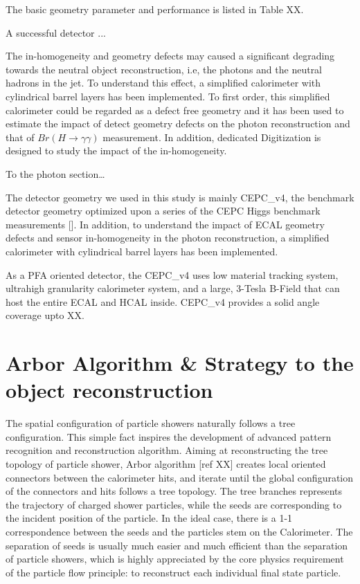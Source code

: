 The basic geometry parameter and performance is listed in Table XX. 


A successful detector ... 

The in-homogeneity and geometry defects may caused a significant degrading towards the neutral object reconstruction,
i.e, the photons and the neutral hadrons in the jet.
To understand this effect, a simplified calorimeter with cylindrical barrel layers has been implemented.
To first order, this simplified calorimeter could be regarded as a defect free geometry
and it has been used to estimate the impact of detect geometry defects on the photon reconstruction
and that of $Br(H\to\gamma\gamma)$ measurement.
In addition, dedicated Digitization is designed to study the impact of the in-homogeneity. 

To the photon section…

The detector geometry we used in this study is mainly CEPC\_v4,
the benchmark detector geometry optimized upon a series of the CEPC Higgs benchmark measurements [].
In addition, to understand the impact of ECAL geometry defects and sensor in-homogeneity in the photon reconstruction,
a simplified calorimeter with cylindrical barrel layers has been implemented.

As a PFA oriented detector, the CEPC\_v4 uses low material tracking system,
ultrahigh granularity calorimeter system,
and a large, 3-Tesla B-Field that can host the entire ECAL and HCAL inside. CEPC\_v4 provides a solid angle coverage upto XX. 



\section{Arbor Algorithm \& Strategy to the object reconstruction}

The spatial configuration of particle showers naturally follows a tree configuration.
This simple fact inspires the development of advanced pattern recognition and reconstruction algorithm.
Aiming at reconstructing the tree topology of particle shower,
Arbor algorithm [ref XX] creates local oriented connectors between the calorimeter hits,
and iterate until the global configuration of the connectors and hits follows a tree topology.
The tree branches represents the trajectory of charged shower particles,
while the seeds are corresponding to the incident position of the particle.
In the ideal case, there is a 1-1 correspondence between the seeds and the particles stem on the Calorimeter.
The separation of seeds is usually much easier and much efficient than the separation of particle showers,
which is highly appreciated by the core physics requirement of the particle flow principle:
to reconstruct each individual final state particle. 

